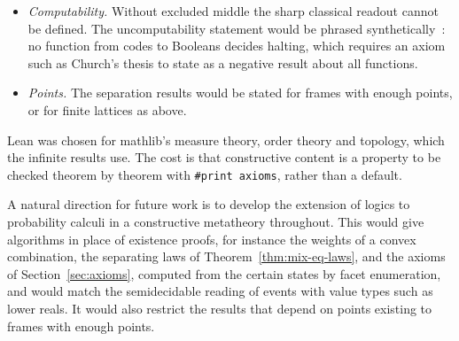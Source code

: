 \begin{itemize}
  require the constructive analysis of Bishop's school, with
  locatedness hypotheses for hyperplane separation. The barycenter
  theorem for infinitely many events requires compactness of
  $\{0,1\}^{\mathbb{N}}$, which constructively is the fan theorem, a
  principle that would have to be added as an axiom.
\item \emph{Computability.} Without excluded middle the sharp classical
  readout cannot be defined. The uncomputability statement would be
  phrased synthetically~\cite{forster2019}: no function from codes to
  Booleans decides halting, which requires an axiom such as Church's
  thesis to state as a negative result about all functions.
\item \emph{Points.} The separation results would be stated for frames
  with enough points, or for finite lattices as above.
\end{itemize}
Lean was chosen for \textsf{mathlib}'s measure theory, order theory and
topology, which the infinite results use. The cost is that constructive
content is a property to be checked theorem by theorem with
\texttt{\#print axioms}, rather than a default.

A natural direction for future work is to develop the extension of logics to
probability calculi in a constructive metatheory throughout. This would give
algorithms in place of existence proofs, for instance the weights of a convex
combination, the separating laws of Theorem~\ref{thm:mix-eq-laws}, and the
axioms of Section~\ref{sec:axioms}, computed from the certain states by facet
enumeration, and would
match the semidecidable reading of events with value types such as lower reals.
It would also restrict the results that depend on points existing to
frames with enough points.
